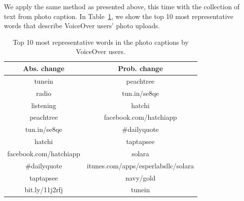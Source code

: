 \documentclass{sigchi}
\newcommand\tabhead[1]{\small\textbf{#1}}
\begin{document}
We apply the same method as presented above, this time with the collection of text from photo caption. In Table~\ref{tab:photo_top_words}, we show the top 10 most representative words that describe VoiceOver users' photo uploads.

\begin{table}
  \centering
  \begin{tabular}{c|c}
    \hline
   \tabhead{Abs. change} & \tabhead{Prob. change} \\
    \hline
  tunein & peachtree \\
  radio & tun.in/se8qe \\
  listening & hatchi \\
  peachtree & facebook.com/hatchiapp \\
  tun.in/se8qe & \#dailyquote \\
  hatchi & taptapsee \\
  facebook.com/hatchiapp & solara \\
  \#dailyquote & itunes.com/apps/esperlabsllc/solara \\
  taptapsee & navy/gold \\
   bit.ly/11j2rfj & tunein \\
  \hline
  \end{tabular}
  \caption{Top 10 most representative words in the photo captions by VoiceOver users. }
  \label{tab:photo_top_words}
\end{table}
\end{document}
